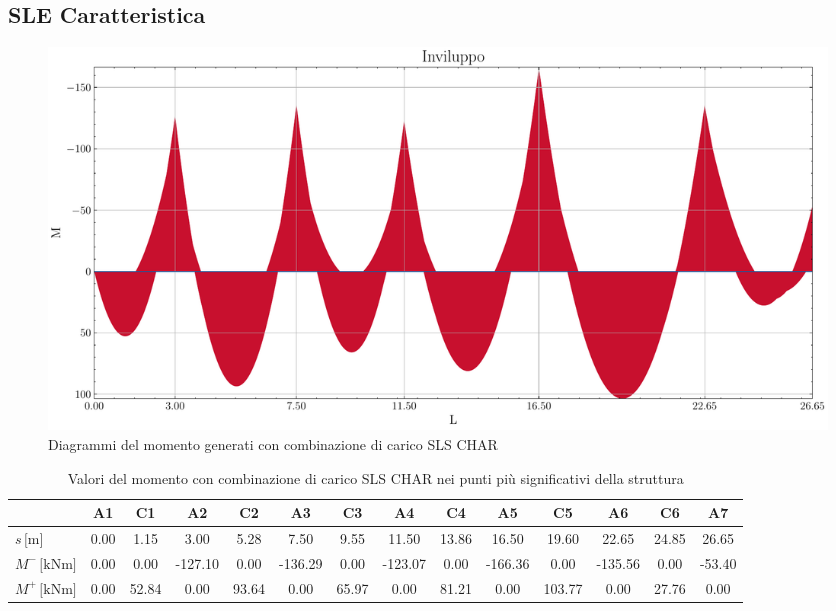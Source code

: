 \begin{landscape}
\subsection{SLE Caratteristica}
\begin{figure}[H]
\centering
\includegraphics[height=0.6\textwidth]{IMG/diagrammi_trave/SLS_CHAR_M.pdf}
\caption{Diagrammi del momento generati con combinazione di carico SLS CHAR}
\label{fig:trave_SLS_CHAR_momento}
\end{figure}
\begin{table}[H]
\footnotesize
\centering
\caption{Valori del momento con combinazione di carico SLS CHAR nei punti più significativi della struttura}
\label{tab:trave_SLS_CHAR_momento}
	\begin{tabular}{lS[table-format=-3.2]S[table-format=-3.2]S[table-format=-3.2]S[table-format=-3.2]S[table-format=-3.2]S[table-format=-3.2]S[table-format=-3.2]S[table-format=-3.2]S[table-format=-3.2]S[table-format=-3.2]S[table-format=-3.2]S[table-format=-3.2]S[table-format=-3.2]}
		\toprule
		{} & {A1} & {C1} & {A2} & {C2} & {A3} & {C3} & {A4} & {C4} & {A5} & {C5} & {A6} & {C6} & {A7} \\
		\midrule
		$s\,\si{[\metre]}$ & 0.00 & 1.15 & 3.00 & 5.28 & 7.50 & 9.55 & 11.50 & 13.86 & 16.50 & 19.60 & 22.65 & 24.85 & 26.65 \\
        $M^{-}\,\si{[\kilo\newton\metre]}$ & 0.00 & 0.00 & -127.10 & 0.00 & -136.29 & 0.00 & -123.07 & 0.00 & -166.36 & 0.00 & -135.56 & 0.00 & -53.40 \\
        $M^{+}\,\si{[\kilo\newton\metre]}$ & 0.00 & 52.84 & 0.00 & 93.64 & 0.00 & 65.97 & 0.00 & 81.21 & 0.00 & 103.77 & 0.00 & 27.76 & 0.00 \\
		\bottomrule
	\end{tabular}
\end{table}
\clearpage

\end{landscape}
